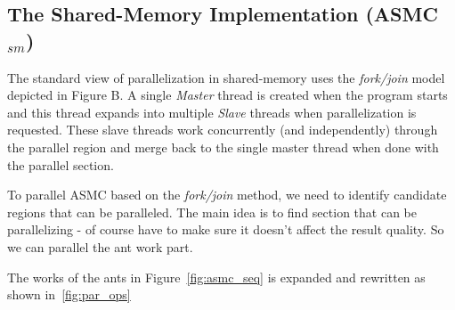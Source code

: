 \documentclass[11pt]{article}
\begin{document}
\subsection{The Shared-Memory Implementation (ASMC$_{sm}$)}\label{ASMC_sm}

The standard view of parallelization in shared-memory uses the \textit{fork/join} model depicted in Figure B. A single \textit{Master} thread is created when the program starts and this thread expands into multiple \textit{Slave} threads when parallelization is requested. These slave threads work concurrently (and independently) through the parallel region and merge back to the single master thread when done with the parallel section.

To parallel ASMC based on the \textit{fork/join} method, we need to identify candidate regions that can be paralleled. 
The main idea is to find section that can be parallelizing - of course have to make sure 
it doesn't affect the result quality.  So we can parallel the ant work part.


The works of the ants in Figure~\ref{fig:asmc_seq} is expanded and rewritten as shown in~\ref{fig:par_ops}

\end{document}
